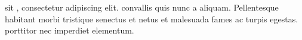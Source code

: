 \documentclass{book}
\begin{document}
   sit , consectetur adipiscing elit.
 convallis quis nunc a aliquam. Pellentesque habitant
morbi tristique senectus et netus et malesuada fames ac
turpis egestas.  porttitor  nec imperdiet elementum.
\end{document}
